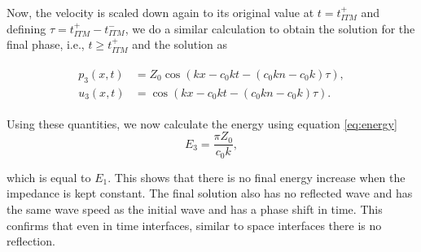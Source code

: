 
Now, the velocity is scaled down again to its original value at $t=t_{ITM}^+$ and defining $\tau = t_{ITM}^+ - t_{ITM}^-$, we do a similar calculation to obtain the solution for the final phase, i.e., $t \geq t_{ITM}^+$ and the solution as

\begin{align}
    \begin{split}
        p_3\left(x, t\right) & = Z_{0} \cos\left(kx - c_{0} k t - {\left(c_{0} k n - c_{0} k\right)} \tau\right) , \\
        u_3\left(x, t\right) & =  \cos\left(kx - c_{0} k t - {\left(c_{0} k n - c_{0} k\right)} \tau\right) . 
    \end{split}
\end{align}

Using these quantities, we now calculate the energy using equation \ref{eq:energy}
\begin{equation}
    E_3 = \frac{\pi Z_0}{c_0 k} ,
\end{equation}

which is equal to $E_1$. This shows that there is no final energy increase when the impedance is kept constant. The final solution also has no reflected wave and has the same wave speed as the initial wave and has a phase shift in time. This confirms that even in time interfaces, similar to space interfaces there is no reflection.

